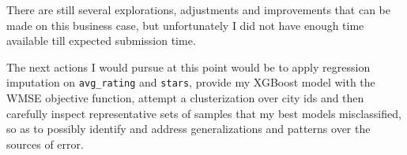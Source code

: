 \documentclass[preprint,12pt,3p]{elsarticle}
\begin{document}
There are still several explorations, adjustments and improvements that can be made on this business case, but unfortunately I did not have enough time available till expected submission time. 

The next actions I would pursue at this point would be to apply regression imputation on \verb|avg_rating| and \verb|stars|, provide my XGBoost model with the WMSE objective function, attempt a clusterization over city ids and then carefully inspect representative sets of samples that my best models misclassified, so as to possibly identify and address generalizations and patterns over the sources of error.
\end{document}
